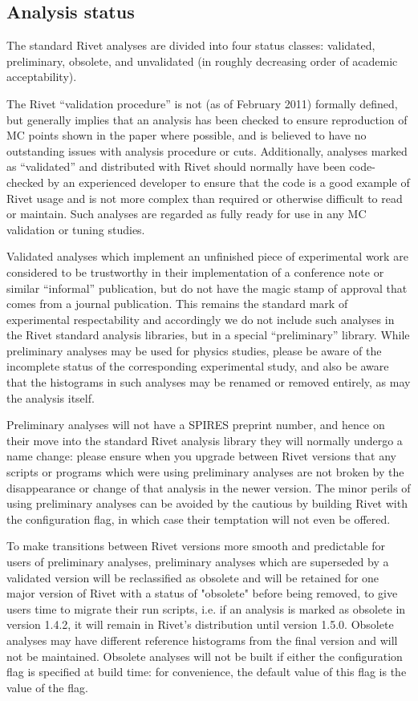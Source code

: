 \documentclass{JHEP3}
\begin{document}
\subsection{Analysis status}

The standard Rivet analyses are divided into four status classes: validated,
preliminary, obsolete, and unvalidated (in roughly decreasing order of academic
acceptability).

The Rivet ``validation procedure'' is not (as of February 2011) formally
defined, but generally implies that an analysis has been checked to ensure
reproduction of MC points shown in the paper where possible, and is believed to
have no outstanding issues with analysis procedure or cuts.  Additionally,
analyses marked as ``validated'' and distributed with Rivet should normally have
been code-checked by an experienced developer to ensure that the code is a good
example of Rivet usage and is not more complex than required or otherwise
difficult to read or maintain. Such analyses are regarded as fully ready for use
in any MC validation or tuning studies.

Validated analyses which implement an unfinished piece of experimental work are
considered to be trustworthy in their implementation of a conference note or
similar ``informal'' publication, but do not have the magic stamp of approval
that comes from a journal publication. This remains the standard mark of
experimental respectability and accordingly we do not include such analyses in
the Rivet standard analysis libraries, but in a special ``preliminary''
library. While preliminary analyses may be used for physics studies, please be
aware of the incomplete status of the corresponding experimental study, and also
be aware that the histograms in such analyses may be renamed or removed
entirely, as may the analysis itself.

Preliminary analyses will not have a SPIRES preprint number, and hence on their
move into the standard Rivet analysis library they will normally undergo a name
change: please ensure when you upgrade between Rivet versions that any scripts
or programs which were using preliminary analyses are not broken by the
disappearance or change of that analysis in the newer version. The minor perils
of using preliminary analyses can be avoided by the cautious by building Rivet
with the  configuration flag, in which case their
temptation will not even be offered.

To make transitions between Rivet versions more smooth and predictable for users
of preliminary analyses, preliminary analyses which are superseded by a
validated version will be reclassified as obsolete and will be retained for one
major version of Rivet with a status of "obsolete" before being removed, to give
users time to migrate their run scripts, i.e. if an analysis is marked as
obsolete in version 1.4.2, it will remain in Rivet's distribution until version
1.5.0.  Obsolete analyses may have different reference histograms from the final
version and will not be maintained. Obsolete analyses will not be built if
either the  configuration flag is specified at build
time: for convenience, the default value of this flag is the value of the
 flag.
\end{document}
